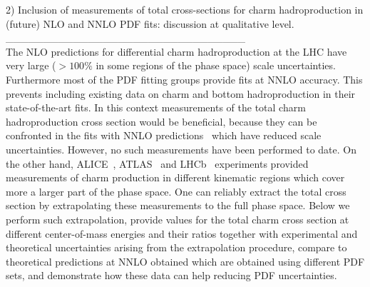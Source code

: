 \documentclass[12pt,a4paper]{article}
\begin{document}
2) Inclusion of measurements of total cross-sections for charm hadroproduction
in (future) NLO and NNLO PDF fits: discussion at qualitative level. 
\\ 
\_\_\_\_\_\_\_\_\_\_\_\_\_\_\_\_\_\_\_\_\_\_\_\_\_\_\_\_\_\_\_\_
\\
The NLO predictions for differential charm hadroproduction at the LHC have very large ($>100\%$ in some regions of the phase space) scale uncertainties. Furthermore most of the PDF fitting groups provide fits at NNLO accuracy. This prevents including existing data on charm and bottom hadroproduction in their state-of-the-art fits. In this context measurements of the total charm hadroproduction cross section would be beneficial, because they can be confronted in the fits with NNLO predictions~\cite{Baernreuther:2012ws,Czakon:2012zr,Czakon:2012pz,Czakon:2013goa} which have reduced scale uncertainties. However, no such measurements have been performed to date. On the other hand, ALICE~\cite{Acharya:2017jgo,Acharya:2019mgn}, ATLAS~\cite{Aad:2015zix} and LHCb~\cite{Aaij:2013mga,Aaij:2015bpa,Aaij:2016jht} experiments provided measurements of charm production in different kinematic regions which cover more a larger part of the phase space. One can reliably extract the total cross section by extrapolating these measurements to the full phase space. Below we perform such extrapolation, provide values for the total charm cross section at different center-of-mass energies and their ratios together with experimental and theoretical uncertainties arising from the extrapolation procedure, compare to theoretical predictions at NNLO obtained which are obtained using different PDF sets, and demonstrate how these data can help reducing PDF uncertainties.
\end{document}

